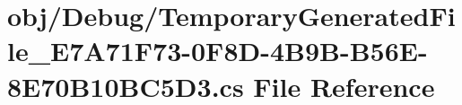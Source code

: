 \hypertarget{TemporaryGeneratedFile__E7A71F73-0F8D-4B9B-B56E-8E70B10BC5D3_8cs}{}\section{obj/\+Debug/\+Temporary\+Generated\+File\+\_\+\+E7\+A71\+F73-\/0\+F8\+D-\/4\+B9\+B-\/\+B56\+E-\/8\+E70\+B10\+B\+C5\+D3.cs File Reference}
\label{TemporaryGeneratedFile__E7A71F73-0F8D-4B9B-B56E-8E70B10BC5D3_8cs}
